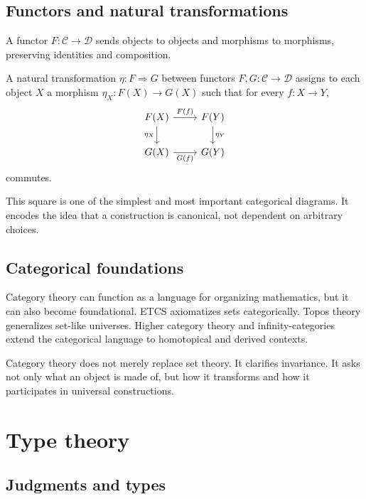 \subsection{Functors and natural transformations}

\begin{definition}
A functor \(F:\mathcal C\to\mathcal D\) sends objects to objects and morphisms to morphisms, preserving identities and composition.
\end{definition}

\begin{definition}
A natural transformation \(\eta:F\Rightarrow G\) between functors \(F,G:\mathcal C\to\mathcal D\) assigns to each object \(X\) a morphism \(\eta_X:F(X)\to G(X)\) such that for every \(f:X\to Y\),
\[
\begin{tikzcd}
F(X) \arrow[r,"F(f)"] \arrow[d,swap,"\eta_X"] & F(Y) \arrow[d,"\eta_Y"]\\
G(X) \arrow[r,swap,"G(f)"] & G(Y)
\end{tikzcd}
\]
commutes.
\end{definition}

This square is one of the simplest and most important categorical diagrams.  It encodes the idea that a construction is canonical, not dependent on arbitrary choices.

\subsection{Categorical foundations}

Category theory can function as a language for organizing mathematics, but it can also become foundational.  ETCS axiomatizes sets categorically.  Topos theory generalizes set-like universes.  Higher category theory and infinity-categories extend the categorical language to homotopical and derived contexts.

\begin{remark}
Category theory does not merely replace set theory.  It clarifies invariance.  It asks not only what an object is made of, but how it transforms and how it participates in universal constructions.
\end{remark}

\section{Type theory}

\subsection{Judgments and types}

